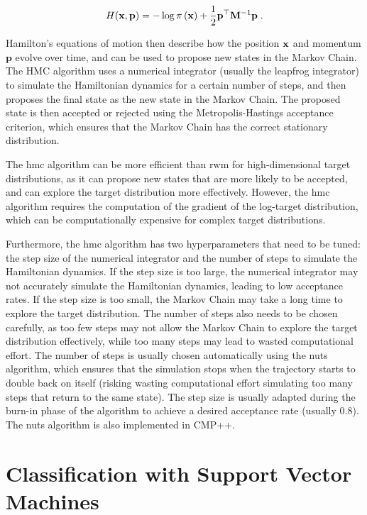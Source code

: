 \begin{equation}
  H(\mathbf{x}, \mathbf{p}) = -\log \pi \left( \mathbf{x}\right) + \frac{1}{2} \mathbf{p}^{\top} \mathbf{M}^{-1} \mathbf{p}\;.
\end{equation}

Hamilton's equations of motion then describe how the position $\mathbf{x}$ and momentum $\mathbf{p}$ evolve over time, and can be used to propose new states in the Markov Chain. The HMC algorithm uses a numerical integrator (usually the leapfrog integrator) to simulate the Hamiltonian dynamics for a certain number of steps, and then proposes the final state as the new state in the Markov Chain. The proposed state is then accepted or rejected using the Metropolis-Hastings acceptance criterion, which ensures that the Markov Chain has the correct stationary distribution.

\smallskip
The \gls{hmc} algorithm can be more efficient than \gls{rwm} for high-dimensional target distributions, as it can propose new states that are more likely to be accepted, and can explore the target distribution more effectively. However, the \gls{hmc} algorithm requires the computation of the gradient of the log-target distribution, which can be computationally expensive for complex target distributions. 

\smallskip
Furthermore, the \gls{hmc} algorithm has two hyperparameters that need to be tuned: the step size of the numerical integrator and the number of steps to simulate the Hamiltonian dynamics. If the step size is too large, the numerical integrator may not accurately simulate the Hamiltonian dynamics, leading to low acceptance rates. If the step size is too small, the Markov Chain may take a long time to explore the target distribution. The number of steps also needs to be chosen carefully, as too few steps may not allow the Markov Chain to explore the target distribution effectively, while too many steps may lead to wasted computational effort. The number of steps is usually chosen automatically using the \gls{nuts} algorithm, which ensures that the simulation stops when the trajectory starts to double back on itself (risking wasting computational effort simulating too many steps that return to the same state). The step size is usually adapted during the burn-in phase of the algorithm to achieve a desired acceptance rate (usually 0.8). The \gls{nuts} algorithm is also implemented in CMP++.



\section{Classification with Support Vector Machines}
\label{sec:ntools:svm}

